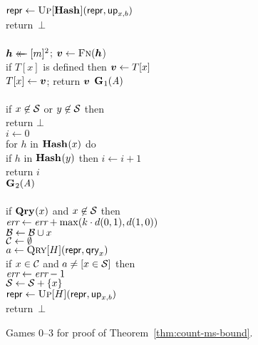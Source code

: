 \begin{figure*}
{      $\mathsf{repr} \gets \textsc{Up}[\mathbf{Hash}\hspace{0.5pt}](\mathsf{repr},\mathsf{up}_{x,b})$\\
      return~$\bot$
    \\[6pt]
    \\
      $\hh \getsr [m]^2$; $\vv \gets \fff(\hh$)\\
      if $T[x]$ is defined then $\vv \gets T[x]$\\
      $T[x] \gets \vv$;
      return $\vv$
  }
  {
    \underline{$\mathbf{G}\hspace{0.5pt}_1(\mathit{A})$}\\[2pt]
    \\
      if $x \not\in \mathcal{S}$ or $y \not\in \mathcal{S}$ then\\
      \tab return $\bot$\\
      $i \gets 0$\\
      for $h$ in $\mathbf{Hash}\hspace{0.5pt}(x)$ do\\
      \tab if $h$ in $\mathbf{Hash}\hspace{0.5pt}(y)$ then $i \gets i+1$\\
      return $i$
    \\[6pt]
    \underline{$\mathbf{G}\hspace{0.5pt}_2(\mathit{A})$}\\[2pt]
    \\
      if $\mathbf{Qry}\hspace{0.5pt}(x)$ and $x \not\in \mathcal{S}$ then\\
      \tab $\textit{err} \gets \textit{err} + \max(k \cdot d(0,1), d(1,0))$\\
      $\mathcal{B} \gets \mathcal{B} \cup x$\\
      $\mathcal{C} \gets \emptyset$\\
      $a \gets \textsc{Qry}[H](\mathsf{repr}, \mathsf{qry}_x)$\\
      if $x \in \mathcal{C}$ and $a \neq [x \in \mathcal{S}]$ then\\
      \tab $\textit{err} \gets \textit{err}-1$\\
      $\mathcal{S} \gets \mathcal{S} + \{x\}$\\
      $\mathsf{repr} \gets \textsc{Up}[H](\mathsf{repr},\mathsf{up}_{x,b})$\\
      return~$\bot$
  }
  {
  }
  {
  }
  \caption{Games 0--3 for proof of Theorem~\ref{thm:count-ms-bound}.}
  \label{fig:count-ms-bound}
\end{figure*}

